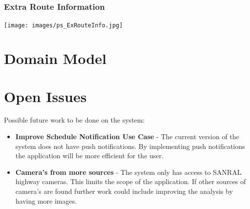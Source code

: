 \documentclass[a4paper,12pt]{article}
\begin{document}
\subsubsection{Extra Route Information}
\texttt{[image: images/ps\_ExRouteInfo.jpg]}
\section{Domain Model}

\section{Open Issues}
Possible future work to be done on the system:
\begin{itemize}
\item \textbf{Improve Schedule Notification Use Case} - The current version of the system does not have push notifications. By implementing push notifications the application will be more efficient for the user.
\item \textbf{Camera's from more sources} - The system only has access to SANRAL highway cameras. This limits the scope of the application. If other sources of camera's are found further work could include improving the analysis by having more images.
\end{itemize}
\end{document}
